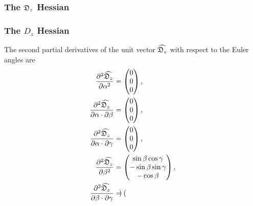\begin{latexonly}
    \subsubsection{The $\mathfrak{D}_z$ Hessian}
\end{latexonly}
\begin{htmlonly}
    \subsubsection{The $D_z$ Hessian}
\end{htmlonly}

The second partial derivatives of the unit vector $\widehat{\mathfrak{D}_z}$ with respect to the Euler angles are
\begin{subequations}
\begin{align}
    \frac{\partial^2 \widehat{\mathfrak{D}_z}}{\partial \alpha^2} &= \begin{pmatrix}
        0 \\
        0 \\
        0 \\
    \end{pmatrix}, \\
    \frac{\partial^2 \widehat{\mathfrak{D}_z}}{\partial \alpha \cdot \partial \beta} &= \begin{pmatrix}
        0 \\
        0 \\
        0 \\
    \end{pmatrix}, \\
    \frac{\partial^2 \widehat{\mathfrak{D}_z}}{\partial \alpha \cdot \partial \gamma} &= \begin{pmatrix}
        0 \\
        0 \\
        0 \\
    \end{pmatrix}, \\
    \frac{\partial^2 \widehat{\mathfrak{D}_z}}{\partial \beta^2} &= \begin{pmatrix}
        \sin \beta \cos \gamma \\
        -\sin \beta \sin \gamma \\
        -\cos \beta \\
    \end{pmatrix}, \\
    \frac{\partial^2 \widehat{\mathfrak{D}_z}}{\partial \beta \cdot \partial \gamma} &= \begin{pmatrix}

\end{pmatrix}
\end{align}
\end{subequations}
